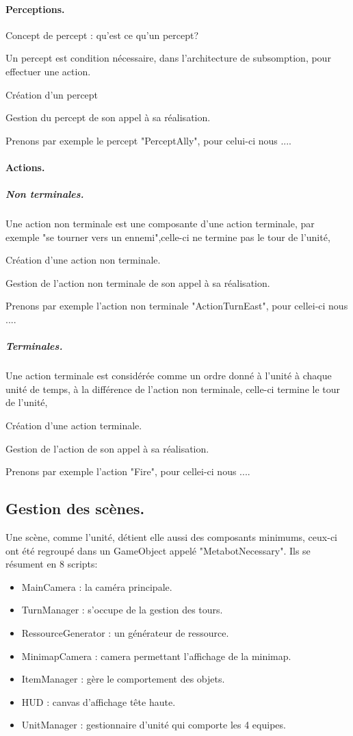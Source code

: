 \documentclass{report}
\begin{document}
\paragraph{Perceptions.}
Concept de percept : qu'est ce qu'un percept?

Un percept est condition nécessaire, dans l'architecture de subsomption, pour effectuer une action.

Création d'un percept

Gestion du percept de son appel à sa réalisation.

Prenons par exemple le percept "PerceptAlly", pour celui-ci nous ....

\paragraph{Actions.}

\subparagraph{Non terminales.}

Une action non terminale est une composante d'une action terminale, par exemple "se tourner vers un ennemi",celle-ci ne termine pas le tour de l'unité, 

Création d'une action non terminale.

Gestion de l'action non terminale de son appel à sa réalisation.

Prenons par exemple l'action non terminale "ActionTurnEast", pour cellei-ci nous ....

\subparagraph{Terminales.}

Une action terminale est considérée comme un ordre donné à l'unité à chaque unité de temps, à la différence de l'action non terminale, celle-ci termine le tour de l'unité, 

Création d'une action terminale.

Gestion de l'action de son appel à sa réalisation.

Prenons par exemple l'action "Fire", pour cellei-ci nous ....

\subsection{Gestion des scènes.}
Une scène, comme l'unité, détient elle aussi des composants minimums, ceux-ci ont été regroupé dans un GameObject appelé "MetabotNecessary".
Ils se résument en 8 scripts:
\begin{itemize}
\item MainCamera : la caméra principale.
\item TurnManager : s'occupe de la gestion des tours.
\item RessourceGenerator : un générateur de ressource.
\item MinimapCamera : camera permettant l'affichage de la minimap.
\item ItemManager : gère le comportement des objets.
\item HUD : canvas d'affichage tête haute.
\item UnitManager : gestionnaire d'unité qui comporte les 4 equipes.
\end{itemize}
\end{document}
